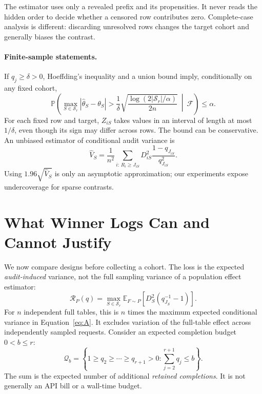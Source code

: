 \documentclass[12pt]{clear2027}
\newcommand{\E}{\mathbb{E}}
\newcommand{\Prb}{\mathbb{P}}
\newcommand{\calS}{\mathcal{S}}
\newcommand{\calQ}{\mathcal{Q}}
\begin{document}
The estimator uses only a revealed prefix and its propensities. It never reads the hidden order to decide whether a censored row contributes zero. Complete-case analysis is different: discarding unresolved rows changes the target cohort and generally biases the contrast.

\paragraph{Finite-sample statements.}
If $q_j\ge\delta>0$, Hoeffding's inequality and a union bound imply, conditionally on any fixed cohort,
\begin{equation}
 \Prb\!\left(\max_{S\in\calS_r}|\widehat\theta_S-\theta_S|>
 \frac1\delta\sqrt{\frac{\log(2|\calS_r|/\alpha)}{2n}}\ \middle|\ \mathcal F\right)\le\alpha.\label{eq:hoeffding}
\end{equation}
For each fixed row and target, $Z_{iS}$ takes values in an interval of length at most $1/\delta$, even though its sign may differ across rows. The bound can be conservative. An unbiased estimator of conditional audit variance is
\begin{equation}
 \widehat V_S=\frac1{n^2}\sum_{i:\,R_i\ge J_{iS}}
 D_{iS}^2\frac{1-q_{J_{iS}}}{q_{J_{iS}}^2}.\label{eq:vhat}
\end{equation}
Using $1.96\sqrt{\widehat V_S}$ is only an asymptotic approximation; our experiments expose undercoverage for sparse contrasts.

\section{What Winner Logs Can and Cannot Justify}
We now compare designs before collecting a cohort. The loss is the expected \emph{audit-induced} variance, not the full sampling variance of a population effect estimator:
\begin{equation}
 \mathcal R_P(q)=\max_{S\in\calS_r}\E_{F\sim P}\!\left[D_S^2(q_{J_S}^{-1}-1)\right].\label{eq:risk}
\end{equation}
For $n$ independent full tables, this is $n$ times the maximum expected conditional variance in Equation~\eqref{eq:A}. It excludes variation of the full-table effect across independently sampled requests. Consider an expected completion budget $0<b\le r$:
\begin{equation}
 \calQ_b=\left\{1\ge q_2\ge\cdots\ge q_{r+1}>0:
 \sum_{j=2}^{r+1}q_j\le b\right\}.\label{eq:budget}
\end{equation}
The sum is the expected number of additional \emph{retained completions}. It is not generally an API bill or a wall-time budget.
\end{document}
